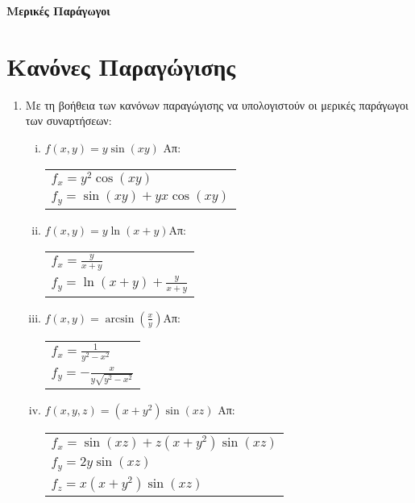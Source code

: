 



\pagestyle{askhseis}

\everymath{\displaystyle}






\begin{center}
  {\color{Col1}\bfseries\large Μερικές Παράγωγοι}
\end{center} 

\section*{Κανόνες Παραγώγισης}

\begin{enumerate}
  \item Με τη βοήθεια των κανόνων παραγώγισης να υπολογιστούν οι μερικές 
    παράγωγοι των συναρτήσεων:

    \begin{enumerate}[i)]
      \item $f(x,y)=y\sin (xy)$ \hfill Απ: \begin{tabular}{l}
          $f_x=y^2\cos(xy)$ \\ 
          $f_y=\sin(xy)+yx\cos(xy)$
        \end{tabular}

      \item $f(x,y)=y\ln(x+y)$\hfill Απ: \begin{tabular}{l}
          $f_x=\frac{y}{x+y}$ \\ 
          $f_y=\ln(x+y)+\frac{y}{x+y}$
        \end{tabular}

      \item $f(x,y)=\arcsin(\frac{x}{y})$\hfill Απ: \begin{tabular}{l}
          $f_x=\frac{1}{y^2-x^2}$ \\ 
          $f_y=-\frac{x}{y\sqrt{y^2-x^2}}$
        \end{tabular}
      \item $ f(x,y,z) = (x+y^{2}) \sin{(xz)} $ \hfill Απ: \begin{tabular}{l}
          $ f_{x} = \sin{(xz)} + z(x+y^{2}) \sin{(xz)} $ \\
          $ f_{y} = 2y \sin{(xz)} $ \\
          $ f_{z} = x(x+y^{2}) \sin{(xz)} $
        \end{tabular} 
    \end{enumerate}


\end{enumerate}
